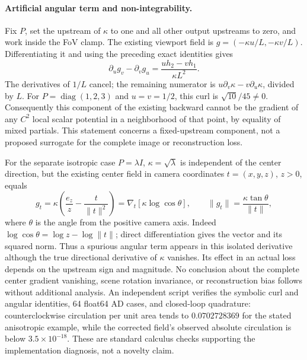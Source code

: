 \documentclass[11pt,a4paper]{article}
\begin{document}
\paragraph{Artificial angular term and non-integrability.}
Fix $P$, set the upstream of $\kappa$ to one and all other output
upstreams to zero, and work inside the FoV clamp. The existing viewport
field is $g=(-\kappa u/L,-\kappa v/L)$. Differentiating it and using the
preceding exact identities gives
\[
 \partial_u g_v-\partial_v g_u
 =\frac{u h_2-v h_1}{\kappa L^2}.
\]
The derivatives of $1/L$ cancel; the remaining numerator is
$u\partial_v\kappa-v\partial_u\kappa$, divided by $L$.
For $P=\operatorname{diag}(1,2,3)$ and $u=v=1/2$, this curl is
$\sqrt{10}/45\ne0$. Consequently this component of the existing
backward cannot be the gradient of any $C^2$ local scalar potential
in a neighborhood of that point, by equality of mixed partials.
This statement concerns a fixed-upstream component, not a proposed
surrogate for the complete image or reconstruction loss.

For the separate isotropic case $P=\lambda I$, $\kappa=\sqrt\lambda$
is independent of the center direction, but the existing center field
in camera coordinates $t=(x,y,z)$, $z>0$, equals
\[
 g_t=\kappa\left(\frac{e_z}{z}-\frac{t}{\|t\|^2}\right)
 =\nabla_t[\kappa\log\cos\theta],\qquad
 \|g_t\|=\frac{\kappa\tan\theta}{\|t\|},
\]
where $\theta$ is the angle from the positive camera axis. Indeed
$\log\cos\theta=\log z-\log\|t\|$; direct differentiation gives
the vector and its squared norm. Thus a spurious angular term appears
in this isolated derivative although the true directional derivative
of $\kappa$ vanishes. Its effect in an actual loss depends on the
upstream sign and magnitude. No conclusion about the complete center
gradient vanishing, scene rotation invariance, or reconstruction bias
follows without additional analysis.
An independent script verifies the symbolic curl and angular identities,
64 float64 AD cases, and closed-loop quadrature: counterclockwise
circulation per unit area tends to $0.0702728369$ for the stated
anisotropic example, while the corrected field's observed absolute
circulation is below $3.5\times10^{-18}$. These are standard calculus
checks supporting the implementation diagnosis, not a novelty claim.
\end{document}
